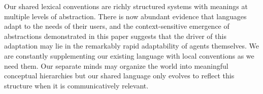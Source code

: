Our shared lexical conventions are richly structured systems with meanings at multiple levels of abstraction. There is now abundant evidence that languages adapt to the needs of their users, and the context-sensitive emergence of abstractions demonstrated in this paper suggests that the driver of this adaptation may lie in the remarkably rapid adaptability of agents themselves. We are constantly supplementing our existing language with local conventions as we need them. Our separate minds may organize the world into meaningful conceptual hierarchies but our shared language only evolves to reflect this structure when it is communicatively relevant. 




